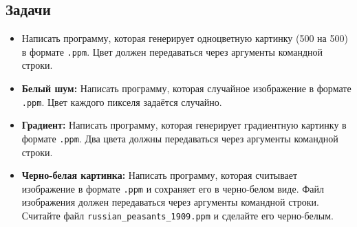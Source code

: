 \documentclass{article}
\begin{document}
\subsection*{Задачи}
\begin{itemize}
\item Написать программу, которая генерирует одноцветную картинку (500 на 500) в формате \texttt{.ppm}. Цвет должен передаваться через аргументы командной строки.
\item \textbf{Белый шум:} Написать программу, которая случайное изображение в формате \texttt{.ppm}. Цвет каждого пикселя задаётся случайно.
\item \textbf{Градиент:} Написать программу, которая генерирует градиентную картинку в формате \texttt{.ppm}. Два цвета должны передаваться через аргументы командной строки.
\item \textbf{Черно-белая картинка:} Написать программу, которая считывает изображение в формате \texttt{.ppm} и сохраняет его в черно-белом виде. Файл изображения должен передаваться через аргументы командной строки. Считайте файл \texttt{russian\_peasants\_1909.ppm} и сделайте его черно-белым.
\end{itemize}
\end{document}
